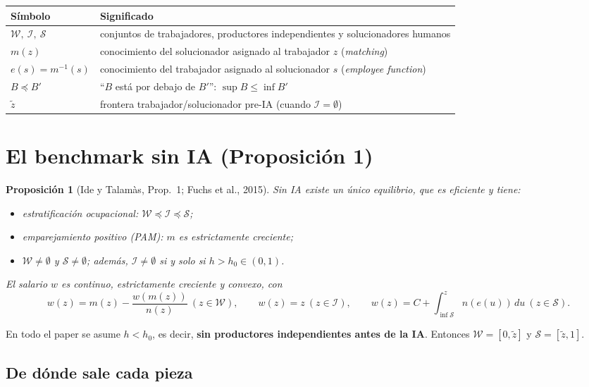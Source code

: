 \documentclass[11pt]{article}
\newtheorem{proposicion}{Proposición}
\theoremstyle{definition}
\theoremstyle{remark}
\newcommand{\zt}{\tilde z}
\newcommand{\W}{\mathcal W}
\newcommand{\Sset}{\mathcal S}
\newcommand{\I}{\mathcal I}
\newcommand{\below}{\preceq}
\begin{document}
\begin{table}[h]
\centering
\begin{tabular}{@{}ll@{}}
\toprule
Símbolo & Significado \\ \midrule
$\W,\ \I,\ \Sset$ & conjuntos de trabajadores, productores independientes y solucionadores humanos \\
$m(z)$ & conocimiento del solucionador asignado al trabajador $z$ (\emph{matching}) \\
$e(s)=m^{-1}(s)$ & conocimiento del trabajador asignado al solucionador $s$ (\emph{employee function}) \\
$B\below B'$ & ``$B$ está por debajo de $B'$'': $\sup B\le\inf B'$ \\
$\zt$ & frontera trabajador/solucionador pre-IA (cuando $\I=\emptyset$) \\
\bottomrule
\end{tabular}
\end{table}

\section{El benchmark sin IA (Proposición 1)}

\begin{proposicion}[Ide y Talamàs, Prop.~1; Fuchs et al., 2015]
Sin IA existe un único equilibrio, que es eficiente y tiene:
\begin{itemize}
  \item estratificación ocupacional: $\W\below\I\below\Sset$;
  \item emparejamiento positivo (PAM): $m$ es estrictamente creciente;
  \item $\W\neq\emptyset$ y $\Sset\neq\emptyset$; además, $\I\neq\emptyset$ si y solo si $h>h_0\in(0,1)$.
\end{itemize}
El salario $w$ es continuo, estrictamente creciente y convexo, con
\[
  w(z)=m(z)-\frac{w(m(z))}{n(z)}\ (z\in\W),\qquad
  w(z)=z\ (z\in\I),\qquad
  w(z)=C+\int_{\inf\Sset}^{z} n(e(u))\,du\ (z\in\Sset).
\]
\end{proposicion}

En todo el paper se asume $h<h_0$, es decir, \textbf{sin productores independientes antes de la IA}. Entonces $\W=[0,\zt]$ y $\Sset=[\zt,1]$.

\subsection{De dónde sale cada pieza}
\end{document}

